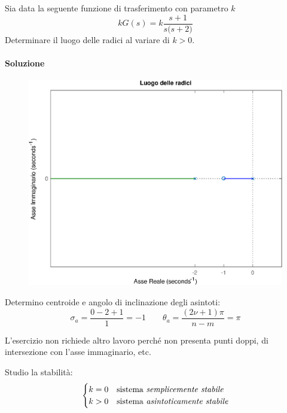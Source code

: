 \begin{esercizio}
Sia data la seguente funzione di trasferimento con parametro \(k\)
\[
	kG(s) = k \frac{s+1}{s \bigl( s+2 \bigr)}
\]
Determinare il luogo delle radici al variare di \(k > 0\).

\paragraph{Soluzione}

\begin{figure}[ht]
	\centering
	\includegraphics[scale=.6]{mod1/assets/rl_ex31}
\end{figure}

Determino centroide e angolo di inclinazione degli asintoti:
\[
	\sigma_a = \frac{0 -2 +1}{1} = -1
	\qquad
	\theta_a = \frac{(2\nu+1)\pi}{n-m} = \pi
\]

L'esercizio non richiede altro lavoro perché non presenta punti doppi, di
intersezione con l'asse immaginario, etc.

Studio la stabilità:
\[\begin{cases}
	k = 0 & \text{sistema \emph{semplicemente stabile}} \\
	k > 0 & \text{sistema \emph{asintoticamente stabile}} \\
\end{cases}\]
\end{esercizio}

